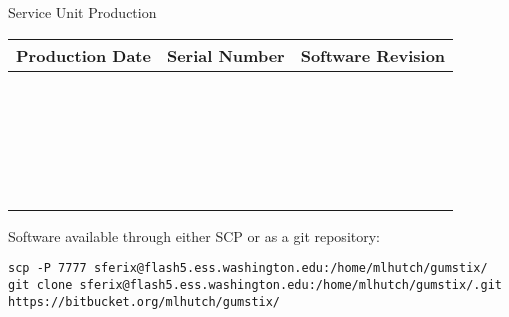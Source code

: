 \documentclass[12pt, letterpaper, onecolumn, oneside]{article}
\begin{document}
\begin{centering}
\Large{Service Unit Production}

\end{centering}

\begin{table}[h!]
\begin{center}
\begin{tabular}{|p{2in}|p{2in}|p{2in}|}

\hline
{\bf Production Date} &	{\bf Serial Number} &	{\bf Software Revision}\\
\hline
\rule{0pt}{3ex}
	&	&	\\ 
\hline
\rule{0pt}{3ex}
	&	&	\\ 
\hline
\rule{0pt}{3ex}
	&	&	\\ 
\hline
\rule{0pt}{3ex}
	&	&	\\ 
\hline
\rule{0pt}{3ex}
	&	&	\\ 
\hline
\rule{0pt}{3ex}
	&	&	\\ 
	\hline
\rule{0pt}{3ex}
	&	&	\\ 
\hline
\rule{0pt}{3ex}
	&	&	\\ 
\hline
\rule{0pt}{3ex}
	&	&	\\ 
	\hline
\rule{0pt}{3ex}
	&	&	\\ 
\hline
\rule{0pt}{3ex}
	&	&	\\ 
\hline
\rule{0pt}{3ex}
	&	&	\\ 
	\hline
\rule{0pt}{3ex}
	&	&	\\ 
\hline
\rule{0pt}{3ex}
	&	&	\\ 
\hline
\rule{0pt}{3ex}
	&	&	\\ 
	\hline
\rule{0pt}{3ex}
	&	&	\\ 
\hline
\rule{0pt}{3ex}
	&	&	\\ 
\hline
\rule{0pt}{3ex}
	&	&	\\ 
	\hline
\rule{0pt}{3ex}
	&	&	\\ 
\hline
\rule{0pt}{3ex}
	&	&	\\ 
\hline
\rule{0pt}{3ex}
	&	&	\\ 
	\hline
\rule{0pt}{3ex}
	&	&	\\ 
\hline
\rule{0pt}{3ex}
	&	&	\\ 

\hline
\end{tabular}
\end{center}
\label{label}
\end{table}

Software available through either SCP or as a git repository:
\begin{verbatim}
scp -P 7777 sferix@flash5.ess.washington.edu:/home/mlhutch/gumstix/
git clone sferix@flash5.ess.washington.edu:/home/mlhutch/gumstix/.git
https://bitbucket.org/mlhutch/gumstix/
\end{verbatim}

%
%
\end{document}
